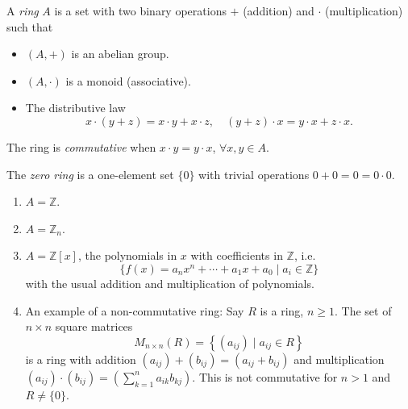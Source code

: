 \begin{defn}[Ring]
A \emph{ring} $A$ is a set with two binary operations $+$ (addition) and $\cdot$
(multiplication) such that
\begin{itemize}
  \item{
    $(A, +)$ is an abelian group.
  }
  \item{
    $(A, \cdot)$ is a monoid (associative).
  }
  \item{
    The distributive law
    $$
    x \cdot (y + z) = x \cdot y + x \cdot z, \quad
    (y + z) \cdot x = y \cdot x + z \cdot x.
    $$
  }
\end{itemize}

The ring is \emph{commutative} when $x \cdot y = y \cdot x$, $\forall x, y
\in A$.

The \emph{zero ring} is a one-element set $\{0\}$ with trivial
operations $0 + 0 = 0 = 0 \cdot 0$.

\end{defn}

\begin{xmpl}
\begin{enumerate}
  \item{
    $A = \mathbb{Z}$.
  }
  \item{
    $A = \mathbb{Z}_n$.
  }
  \item{
    $A = \mathbb{Z}[x]$, the polynomials in $x$ with coefficients in
    $\mathbb{Z}$, i.e.
    $$
    \{ f(x) = a_n x^n + \cdots + a_1 x + a_0 \mid a_i \in \mathbb{Z} \}
    $$
    with the usual addition and multiplication of polynomials.
  }
  \item{
    An example of a non-commutative ring: Say $R$ is a ring, $n \geq
    1$. The set of $n \times n$ square matrices
    $$
    M_{n \times n}(R)
      = \left\{ ( a_{ij} ) \mid a_{ij} \in R \right\}
    $$
    is a ring with addition
    $(a_{ij}) + (b_{ij}) = (a_{ij} + b_{ij})$
    and multiplication
    $(a_{ij}) \cdot (b_{ij}) = \left(\sum_{k=1}^n a_{ik}
      b_{kj}\right)$. This is not commutative for $n > 1$ and $R \neq
    \{ 0 \}$.
  }
\end{enumerate}
\end{xmpl}

